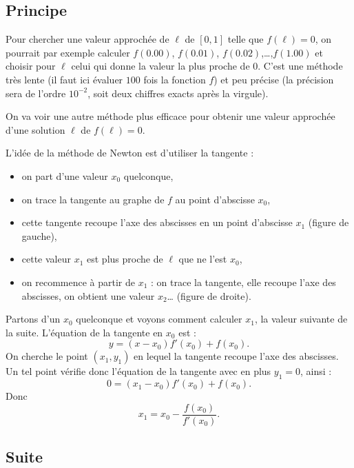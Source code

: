 \documentclass[11pt,class=report,crop=false]{standalone}
\begin{document}
\subsection{Principe}

Pour chercher une valeur approchée de $\ell$ de $[0,1]$ telle que $f(\ell)=0$,  on pourrait par exemple calculer $f(0.00)$, $f(0.01)$, $f(0.02)$,\ldots,$f(1.00)$ et choisir pour $\ell$ celui qui donne la valeur la plus proche de $0$. C'est une méthode très lente (il faut ici évaluer $100$ fois la fonction $f$) et peu précise (la précision sera de l'ordre $10^{-2}$, soit deux chiffres exacts après la virgule).

On va voir une autre méthode plus efficace pour obtenir une valeur approchée d'une solution $\ell$ de $f(\ell)=0$.


L'idée de la méthode de Newton est d'utiliser la tangente :
\begin{itemize} 
  \item on part d'une valeur $x_0$ quelconque,
  \item on trace la tangente au graphe de $f$ au point d'abscisse $x_0$,
  \item cette tangente recoupe l'axe des abscisses en un point d'abscisse $x_1$ (figure de gauche),
  \item cette valeur $x_1$ est plus proche de $\ell$ que ne l'est $x_0$,
  \item on recommence à partir de $x_1$ : on trace la tangente, elle recoupe l'axe des abscisses, on obtient une valeur $x_2$\ldots{} (figure de droite).
\end{itemize}
  
  
Partons d'un $x_0$ quelconque et voyons comment calculer $x_1$, la valeur suivante de la suite. L'équation de la tangente en $x_0$ est :
$$y = (x-x_0) f'(x_0) + f(x_0).$$
On cherche le point $(x_1,y_1)$ en lequel la tangente recoupe l'axe des abscisses. Un tel point vérifie donc l'équation de la tangente avec en plus $y_1=0$, ainsi :
$$0 = (x_1-x_0) f'(x_0) + f(x_0).$$
Donc 
$$x_1 = x_0 - \frac{f(x_0)}{f'(x_0)}.$$

  
\subsection{Suite}
  
\end{document}
